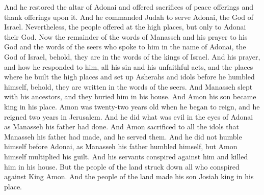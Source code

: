 \begin{biblechapter}
\verse And he restored the altar of Adonai and offered sacrifices of peace offerings and thank offerings upon it. And he commanded Judah to serve Adonai, the God of Israel.
\verse Nevertheless, the people offered at the high places, but only to Adonai their God.
\verse Now the remainder of the words of Manasseh and his prayer to his God and the words of the seers who spoke to him in the name of Adonai, the God of Israel, behold, they are in the words of the kings of Israel.
\verse And his prayer, and how he responded to him, all his sin and his unfaithful acts, and the places where he built the high places and set up Asherahs and idols before he humbled himself, behold, they are written in the words of the seers.
 And Manasseh slept with his ancestors, and they buried him in his house. And Amon his son became king in his place.
\verse Amon was twenty-two years old when he began to reign, and he reigned two years in Jerusalem.
\verse And he did what was evil in the eyes of Adonai as Manasseh his father had done. And Amon sacrificed to all the idols that Manasseh his father had made, and he served them.
\verse And he did not humble himself before Adonai, as Manasseh his father humbled himself, but Amon himself multiplied his guilt.
\verse And his servants conspired against him and killed him in his house.
\verse But the people of the land struck down all who conspired against King Amon. And the people of the land made his son Josiah king in his place.
\end{biblechapter}

